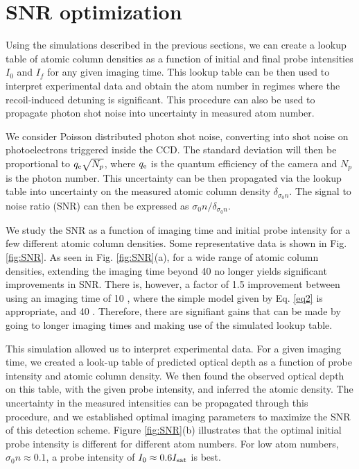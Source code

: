 \section{SNR optimization}

Using the simulations described in the previous sections, we can create a lookup table of atomic column densities as a function of initial and final probe intensities $I_0$ and $I_f$ for any given imaging time. This lookup table can be then used to interpret experimental data and obtain the atom number in regimes where the recoil-induced detuning is significant. This procedure can also be used to propagate photon shot noise into uncertainty in measured atom number. 

We consider Poisson distributed photon shot noise, converting into shot noise on photoelectrons triggered inside the CCD. The standard deviation will then be proportional to $q_{\rm{e}}\sqrt{N_p}$, where $q_{\rm{e}}$ is the quantum efficiency of the camera and $N_p$ is the photon number. This uncertainty can be then propagated via the lookup table into uncertainty on the measured atomic column density $\delta_{\sigma_0 n}$. The signal to noise ratio (SNR) can then be expressed as $\sigma_0 n/\delta_{\sigma_0 n}$.

We study the SNR as a function of imaging time and initial probe intensity for a few different atomic column densities. Some representative data is shown in  Fig. \ref{fig:SNR}. As seen in Fig. \ref{fig:SNR}(a), for a wide range of atomic column densities, extending the imaging time beyond 40 \us{} no longer yields significant improvements in SNR. There is, however, a factor of 1.5 improvement between using an imaging time of 10 \us{}, where the simple model given by Eq. \ref{eq2} is appropriate, and 40 \us{}. Therefore, there are signifiant gains that can be made by going to longer imaging times and making use of the simulated lookup table.  


This simulation allowed us to interpret experimental data. For a given imaging time, we created a look-up table of predicted optical depth as a function of probe intensity and atomic column density. We then found the observed optical depth on this table, with the given probe intensity, and inferred the atomic density. The uncertainty in the measured intensities can be propagated through this procedure, and we established optimal imaging parameters to maximize the SNR of this detection scheme. Figure \ref{fig:SNR}(b) illustrates that the optimal initial probe intensity is different for different atom numbers. For low atom numbers, $\sigma_0 n\approx0.1$, a probe intensity of $I_0\approx0.6 I_{\rm{sat}}$ is best.


